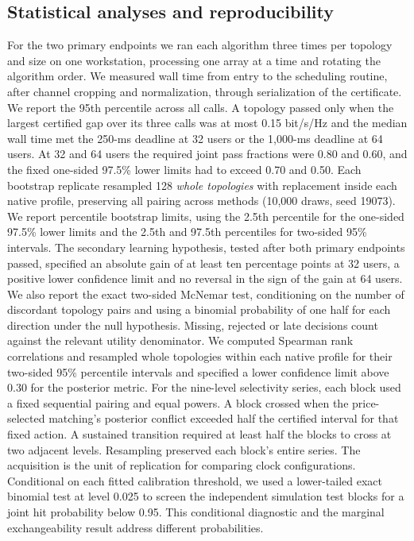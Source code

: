 \documentclass[lineno,pdflatex,sn-nature]{sn-jnl}
\begin{document}
\subsection*{Statistical analyses and reproducibility}
For the two primary endpoints we ran each algorithm three times per topology and size on one workstation, processing one array at a time and rotating the algorithm order. We measured wall time from entry to the scheduling routine, after channel cropping and normalization, through serialization of the certificate. We report the 95th percentile across all calls. A topology passed only when the largest certified gap over its three calls was at most 0.15 bit/s/Hz and the median wall time met the 250-ms deadline at 32 users or the 1,000-ms deadline at 64 users. At 32 and 64 users the required joint pass fractions were 0.80 and 0.60, and the fixed one-sided 97.5\% lower limits had to exceed 0.70 and 0.50. Each bootstrap replicate resampled 128 \emph{whole topologies} with replacement inside each native profile, preserving all pairing across methods (10,000 draws, seed 19073). We report percentile bootstrap limits, using the 2.5th percentile for the one-sided 97.5\% lower limits and the 2.5th and 97.5th percentiles for two-sided 95\% intervals. The secondary learning hypothesis, tested after both primary endpoints passed, specified an absolute gain of at least ten percentage points at 32 users, a positive lower confidence limit and no reversal in the sign of the gain at 64 users. We also report the exact two-sided McNemar test, conditioning on the number of discordant topology pairs and using a binomial probability of one half for each direction under the null hypothesis. Missing, rejected or late decisions count against the relevant utility denominator. We computed Spearman rank correlations and resampled whole topologies within each native profile for their two-sided 95\% percentile intervals and specified a lower confidence limit above 0.30 for the posterior metric. For the nine-level selectivity series, each block used a fixed sequential pairing and equal powers. A block crossed when the price-selected matching's posterior conflict exceeded half the certified interval for that fixed action. A sustained transition required at least half the blocks to cross at two adjacent levels. Resampling preserved each block's entire series. The acquisition is the unit of replication for comparing clock configurations. Conditional on each fitted calibration threshold, we used a lower-tailed exact binomial test at level 0.025 to screen the independent simulation test blocks for a joint hit probability below 0.95. This conditional diagnostic and the marginal exchangeability result address different probabilities.
\end{document}
